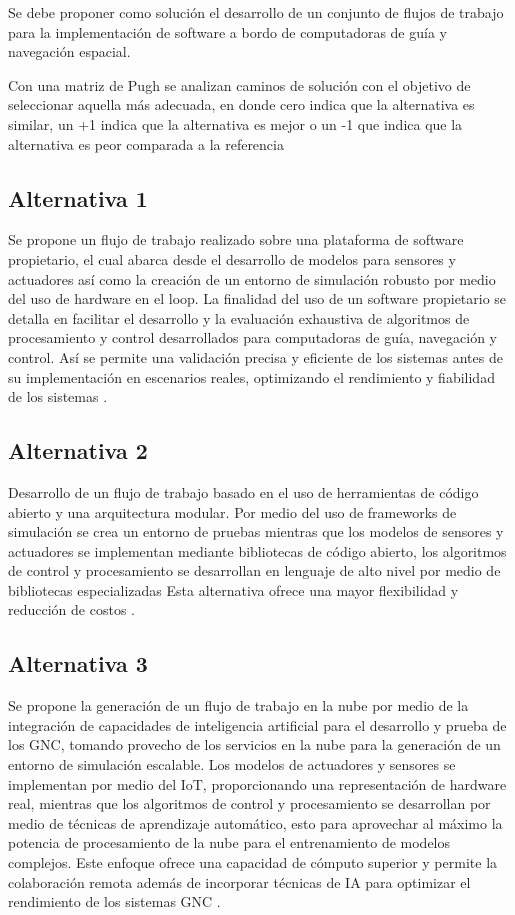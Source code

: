 \documentclass[12pt]{article}
\begin{document}
Se debe proponer como solución el desarrollo de un conjunto de flujos de trabajo para la implementación de software a bordo de computadoras de guía y navegación espacial.

Con una matriz de Pugh se analizan caminos de solución con el objetivo de seleccionar aquella más adecuada, en donde cero indica que la alternativa es similar, un +1 indica que la alternativa es mejor o un -1 que indica que la alternativa es peor comparada a la referencia


\subsection{Alternativa 1}

Se propone un flujo de trabajo realizado sobre una plataforma de software propietario, el cual abarca desde el desarrollo de modelos para sensores y actuadores así como la creación de un entorno de simulación robusto por medio del uso de hardware en el loop. La finalidad del uso de un software propietario se detalla en facilitar el desarrollo y la evaluación exhaustiva de algoritmos de procesamiento y control desarrollados para computadoras de guía, navegación y control. Así se permite una validación precisa y eficiente de los sistemas antes de su implementación en escenarios reales, optimizando el rendimiento y fiabilidad de los sistemas \cite{MathWorks2024} \cite{montoya2020advanced}.

\subsection{Alternativa 2}

Desarrollo de un flujo de trabajo basado en el uso de herramientas de código abierto y una arquitectura modular. Por medio del uso de frameworks de simulación se crea un entorno de pruebas mientras que los modelos de sensores y actuadores se implementan mediante bibliotecas de código abierto, los algoritmos de control y procesamiento se desarrollan en lenguaje de alto nivel por medio de bibliotecas especializadas Esta alternativa ofrece una mayor flexibilidad y reducción de costos \cite{Furfaro1997}.

\subsection{Alternativa 3}
Se propone la generación de un flujo de trabajo en la nube por medio de la integración de capacidades de inteligencia artificial para el desarrollo y prueba de los GNC, tomando provecho de los servicios en la nube para la generación de un entorno de simulación escalable. Los modelos de actuadores y sensores se implementan por medio del IoT, proporcionando una representación de hardware real, mientras que los algoritmos de control y procesamiento se desarrollan por medio de técnicas de aprendizaje automático, esto para aprovechar al máximo la potencia de procesamiento de la nube para el entrenamiento de modelos complejos. Este enfoque ofrece una capacidad de cómputo superior y permite la colaboración remota además de incorporar técnicas de IA para optimizar el rendimiento de los sistemas GNC \cite{wang2022deep} \cite{bitlmal2024guidance}.
\end{document}
